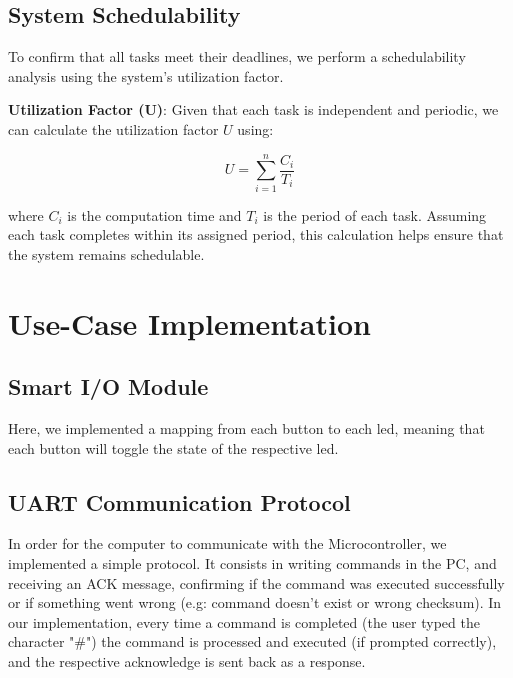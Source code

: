 \documentclass[a4paper,12pt]{article}
\begin{document}
\subsection{System Schedulability}
To confirm that all tasks meet their deadlines, we perform a schedulability analysis using the system's utilization factor.

\textbf{Utilization Factor (U)}: Given that each task is independent and periodic, we can calculate the utilization factor \( U \) using:

\[
U = \sum_{i=1}^n \frac{C_i}{T_i}
\]

where \( C_i \) is the computation time and \( T_i \) is the period of each task. Assuming each task completes within its assigned period, this calculation helps ensure that the system remains schedulable.


\section{Use-Case Implementation}
\subsection{Smart I/O Module}
Here, we implemented a mapping from each button to each led, meaning that each button will toggle the state of the respective led.

\subsection{UART Communication Protocol}
In order for the computer to communicate with the Microcontroller, we implemented a simple protocol. It consists in writing commands in the PC, and receiving an ACK message, confirming if the command was executed successfully or if something went wrong (e.g: command doesn't exist or wrong checksum).
In our implementation, every time a command is completed (the user typed the character "\#") the command is processed and executed (if prompted correctly), and the respective acknowledge is sent back as a response.
\end{document}
